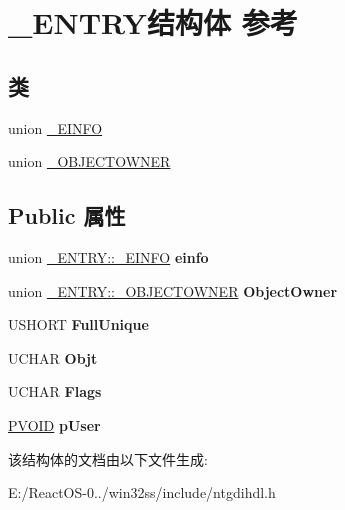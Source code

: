\hypertarget{struct___e_n_t_r_y}{}\section{\+\_\+\+E\+N\+T\+R\+Y结构体 参考}
\label{struct___e_n_t_r_y}
\subsection*{类}
\begin{DoxyCompactItemize}
\item 
union \hyperlink{union___e_n_t_r_y_1_1___e_i_n_f_o}{\+\_\+\+E\+I\+N\+FO}
\item 
union \hyperlink{union___e_n_t_r_y_1_1___o_b_j_e_c_t_o_w_n_e_r}{\+\_\+\+O\+B\+J\+E\+C\+T\+O\+W\+N\+ER}
\end{DoxyCompactItemize}
\subsection*{Public 属性}
\begin{DoxyCompactItemize}
\item 
\mbox{\label{struct___e_n_t_r_y_afd871792b25c1cd859e806ecd889c07f}} 
union \hyperlink{union___e_n_t_r_y_1_1___e_i_n_f_o}{\+\_\+\+E\+N\+T\+R\+Y\+::\+\_\+\+E\+I\+N\+FO} {\bfseries einfo}
\item 
\mbox{\label{struct___e_n_t_r_y_a142f84f7f9e395038c04747e9b05ca03}} 
union \hyperlink{union___e_n_t_r_y_1_1___o_b_j_e_c_t_o_w_n_e_r}{\+\_\+\+E\+N\+T\+R\+Y\+::\+\_\+\+O\+B\+J\+E\+C\+T\+O\+W\+N\+ER} {\bfseries Object\+Owner}
\item 
\mbox{\label{struct___e_n_t_r_y_ae4375e902f5cbbab9a59eedf8d76278c}} 
U\+S\+H\+O\+RT {\bfseries Full\+Unique}
\item 
\mbox{\label{struct___e_n_t_r_y_a869173abecbf89c3cc16d3d3a1dfbe47}} 
U\+C\+H\+AR {\bfseries Objt}
\item 
\mbox{\label{struct___e_n_t_r_y_ab940e27b8582a0410fc341e8f0297564}} 
U\+C\+H\+AR {\bfseries Flags}
\item 
\mbox{\label{struct___e_n_t_r_y_aa495c1490c2af1b71938ee1228517e1d}} 
\hyperlink{interfacevoid}{P\+V\+O\+ID} {\bfseries p\+User}
\end{DoxyCompactItemize}


该结构体的文档由以下文件生成\+:\begin{DoxyCompactItemize}
\item 
E\+:/\+React\+O\+S-\/0../win32ss/include/ntgdihdl.\+h\end{DoxyCompactItemize}
